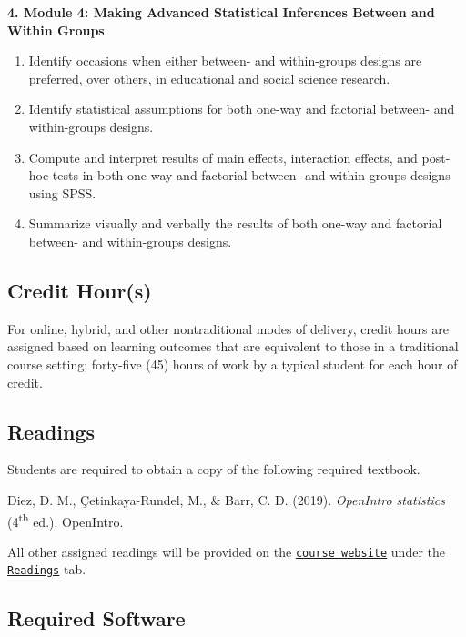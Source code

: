 \documentclass[
]{article}
\providecommand{\tightlist}{%
  \setlength{\itemsep}{0pt}\setlength{\parskip}{0pt}}
\begin{document}
\textbf{4. Module 4: Making Advanced Statistical Inferences Between and
Within Groups}

\begin{enumerate}
\def\labelenumi{\arabic{enumi}.}
\tightlist
\item
  Identify occasions when either between- and within-groups designs are
  preferred, over others, in educational and social science research.
\item
  Identify statistical assumptions for both one-way and factorial
  between- and within-groups designs.
\item
  Compute and interpret results of main effects, interaction effects,
  and post-hoc tests in both one-way and factorial between- and
  within-groups designs using SPSS.
\item
  Summarize visually and verbally the results of both one-way and
  factorial between- and within-groups designs.
\end{enumerate}

\subsection{Credit Hour(s)}

For online, hybrid, and other nontraditional modes of delivery, credit
hours are assigned based on learning outcomes that are equivalent to
those in a traditional course setting; forty-five (45) hours of work by
a typical student for each hour of credit.

\subsection{Readings}

Students are required to obtain a copy of the following required
textbook.

\begin{hangparas}{.4in}{1}
Diez, D. M.,  \c{C}etinkaya-Rundel, M., \& Barr, C. D. (2019).  {\em{OpenIntro statistics}} (4\textsuperscript{th} ed.).  OpenIntro.
\end{hangparas}

All other assigned readings will be provided on the
\texttt{\href{https://mycourses.umhb.edu/courses/23599}{course website}}
under the
\texttt{\href{https://mycourses.umhb.edu/courses/23599/files/folder/Readings}{Readings}}
tab.

\subsection{Required Software}
\end{document}

